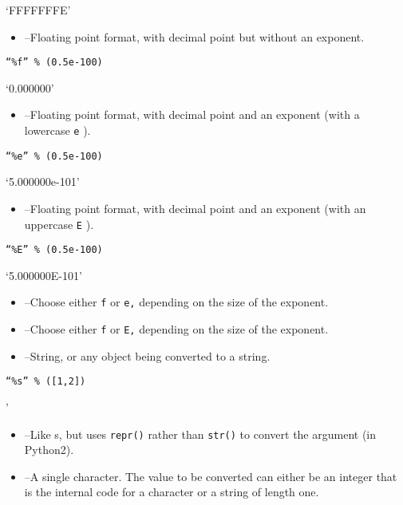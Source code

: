 `FFFFFFFE'

\begin{itemize}

\item
   --Floating point
  format, with decimal point but without an exponent.
\end{itemize}


\texttt{``\%f'' \% (0.5e-100)}

`0.000000'

\begin{itemize}

\item
   --Floating point
  format, with decimal point and an exponent (with a lowercase \texttt{e}
  ).
\end{itemize}


\texttt{``\%e'' \% (0.5e-100)}

`5.000000e-101'

\begin{itemize}

\item
   --Floating point
  format, with decimal point and an exponent (with an uppercase \texttt{E}
  ).
\end{itemize}


\texttt{``\%E'' \% (0.5e-100)}

`5.000000E-101'

\begin{itemize}

\item
   --Choose either
  \texttt{f} or \texttt{e,} depending on the size of the exponent.
\item
   --Choose either
  \texttt{f} or \texttt{E,} depending on the size of the exponent.
\item
   --String, or any object
  being converted to a string.
\end{itemize}


\texttt{``\%s'' \% ({[}1,2{]})}

'

\begin{itemize}

\item
   --Like s, but uses
  \texttt{repr()} rather than \texttt{str()} to convert the argument (in
  Python2).
\item
   --A single character.
  The value to be converted can either be an integer that is the
  internal code for a character or a string of length one.
\end{itemize}


